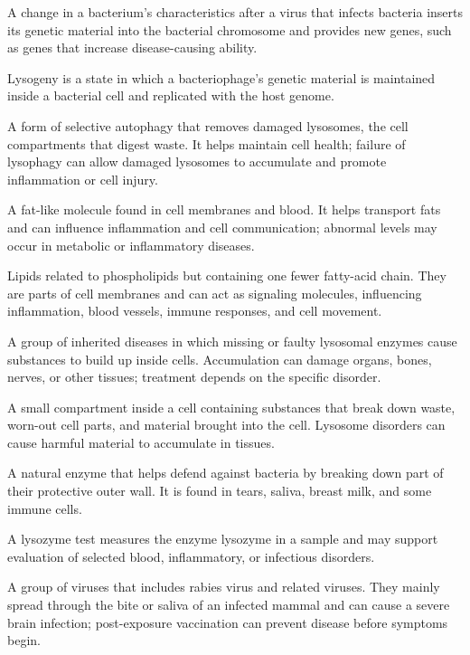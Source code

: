  A change in a bacterium's characteristics after a virus that infects bacteria inserts its genetic material into the bacterial chromosome and provides new genes, such as genes that increase disease-causing ability.

 Lysogeny is a state in which a bacteriophage's genetic material is maintained inside a bacterial cell and replicated with the host genome.

 A form of selective autophagy that removes damaged lysosomes, the cell compartments that digest waste. It helps maintain cell health; failure of lysophagy can allow damaged lysosomes to accumulate and promote inflammation or cell injury.

 A fat-like molecule found in cell membranes and blood. It helps transport fats and can influence inflammation and cell communication; abnormal levels may occur in metabolic or inflammatory diseases.

 Lipids related to phospholipids but containing one fewer fatty-acid chain. They are parts of cell membranes and can act as signaling molecules, influencing inflammation, blood vessels, immune responses, and cell movement.

 A group of inherited diseases in which missing or faulty lysosomal enzymes cause substances to build up inside cells. Accumulation can damage organs, bones, nerves, or other tissues; treatment depends on the specific disorder.

 A small compartment inside a cell containing substances that break down waste, worn-out cell parts, and material brought into the cell. Lysosome disorders can cause harmful material to accumulate in tissues.

 A natural enzyme that helps defend against bacteria by breaking down part of their protective outer wall. It is found in tears, saliva, breast milk, and some immune cells.

 A lysozyme test measures the enzyme lysozyme in a sample and may support evaluation of selected blood, inflammatory, or infectious disorders.

 A group of viruses that includes rabies virus and related viruses. They mainly spread through the bite or saliva of an infected mammal and can cause a severe brain infection; post-exposure vaccination can prevent disease before symptoms begin.

